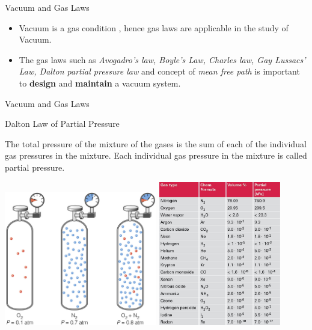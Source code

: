 \documentclass[11]{beamer}
\begin{document}
\begin{frame}{Vacuum and Gas Laws}

\begin{itemize}
\item Vacuum is a gas condition , hence gas laws are applicable in the study of Vacuum.
\item The gas laws such as \emph{Avogadro’s law, Boyle’s Law, Charles law, Gay Lussacs’ Law, Dalton partial pressure law} and concept of \emph{mean free path} is important to \textbf{design} and \textbf{maintain} a vacuum system.
\end{itemize}



\end{frame}
 
\begin{frame}{Vacuum and Gas Laws}
	\begin{exampleblock}{Dalton Law of Partial Pressure}
	
		The total pressure of the mixture of the gases is the sum of each of the individual gas pressures in the mixture. Each individual gas 	        pressure in the mixture is called partial pressure.
	\end{exampleblock}

\includegraphics[width=0.5\textwidth]{dalton_law_of_partial_pressure.jpg}
\includegraphics[width=0.4\textwidth]{Air_Partial_Pressure.jpg}
\end{frame}
\end{document}
